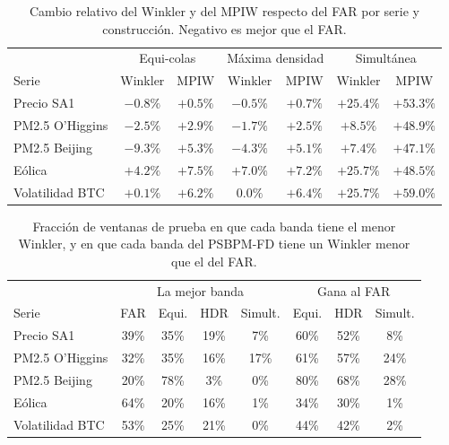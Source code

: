 \begin{table}[H]
\centering\small
\setlength{\tabcolsep}{3pt}
\caption{Cambio relativo del Winkler y del MPIW respecto del FAR por serie y construcción. Negativo es mejor que el FAR.}
\label{tab:aneD_bloqueB_ganancia}
\begin{tabular}{l cc cc cc}
\hline
 & \multicolumn{2}{c}{Equi-colas} & \multicolumn{2}{c}{Máxima densidad} & \multicolumn{2}{c}{Simultánea} \\
Serie & Winkler & MPIW & Winkler & MPIW & Winkler & MPIW \\
\hline
Precio SA1 & $-0.8\%$ & $+0.5\%$ & $-0.5\%$ & $+0.7\%$ & $+25.4\%$ & $+53.3\%$ \\
PM2.5 O'Higgins & $-2.5\%$ & $+2.9\%$ & $-1.7\%$ & $+2.5\%$ & $+8.5\%$ & $+48.9\%$ \\
PM2.5 Beijing & $-9.3\%$ & $+5.3\%$ & $-4.3\%$ & $+5.1\%$ & $+7.4\%$ & $+47.1\%$ \\
Eólica & $+4.2\%$ & $+7.5\%$ & $+7.0\%$ & $+7.2\%$ & $+25.7\%$ & $+48.5\%$ \\
Volatilidad BTC & $+0.1\%$ & $+6.2\%$ & $0.0\%$ & $+6.4\%$ & $+25.7\%$ & $+59.0\%$ \\
\hline
\end{tabular}
\end{table}

\begin{table}[H]
\centering\small
\setlength{\tabcolsep}{3.5pt}
\caption{Fracción de ventanas de prueba en que cada banda tiene el menor Winkler, y en que cada banda del PSBPM-FD tiene un Winkler menor que el del FAR.}
\label{tab:aneD_bloqueB_ventanas}
\begin{tabular}{l cccc ccc}
\hline
 & \multicolumn{4}{c}{La mejor banda} & \multicolumn{3}{c}{Gana al FAR} \\
Serie & FAR & Equi. & HDR & Simult. & Equi. & HDR & Simult. \\
\hline
Precio SA1 & 39\% & 35\% & 19\% & 7\% & 60\% & 52\% & 8\% \\
PM2.5 O'Higgins & 32\% & 35\% & 16\% & 17\% & 61\% & 57\% & 24\% \\
PM2.5 Beijing & 20\% & 78\% & 3\% & 0\% & 80\% & 68\% & 28\% \\
Eólica & 64\% & 20\% & 16\% & 1\% & 34\% & 30\% & 1\% \\
Volatilidad BTC & 53\% & 25\% & 21\% & 0\% & 44\% & 42\% & 2\% \\
\hline
\end{tabular}
\end{table}

